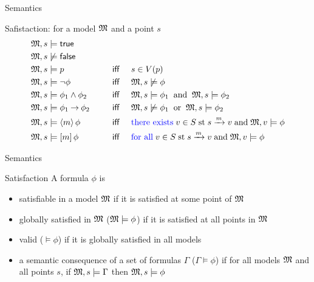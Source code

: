 \documentclass[aspectratio=169]{beamer}
\begin{document}
\begin{slide}{Semantics}\label{s:13}
\small
\begin{block}{Safistaction: for a model $\mathfrak{M}$ and a point $s$}
\begin{align*}
\mathfrak{M}, s & \models \mathsf{true} &&\\
\mathfrak{M}, s & \not \models  \mathsf{false} &&\\
\mathfrak{M}, s & \models  p &  \text{~~~ \textsf{iff} ~~~}  & s \in V(p)\\
\mathfrak{M}, s  & \models \neg \phi  & \text{~~~ \textsf{iff} ~~~} & \mathfrak{M}, s  \not \models \phi \\
\mathfrak{M}, s & \models \phi_1 \mathbin{\wedge} \phi_2  &\text{~~~ \textsf{iff} ~~~} & \mathfrak{M}, s \models  \phi_1 \;\; \text{and}\;\;
                                                   \mathfrak{M}, s \models  \phi_2 \\
\mathfrak{M}, s & \models \phi_1 \mathbin{\rightarrow} \phi_2 & \text{~~~ \textsf{iff} ~~~} & \mathfrak{M}, s \not \models \phi_1  \;\; \text{or}\;\; 
                                                  \mathfrak{M}, s \models \phi_2 \\
\mathfrak{M}, s  &\models \langle m \rangle\, \phi & \text{ ~~~ \textsf{iff} ~~~} &
\text{\textcolor{blue}{there exists}}\; v \in S \;\text{st}\; s \xrightarrow{m} v\; \text{and}\; \mathfrak{M}, v \models \phi\\
\mathfrak{M}, s & \models [m]\, \phi & \text{~~~ \textsf{iff} ~~~} &
\text{\textcolor{blue}{for all}}\; v \in S \; \text{st}\; s \xrightarrow{m} v\; \text{and}\; \mathfrak{M}, v \models \phi\\
\end{align*}
\end{block}
\end{slide}


\begin{slide}{Semantics}\label{s:14}
\small
\begin{block}{Satisfaction}
A formula $\phi$ is
\begin{itemize}
\item \alert{satisfiable in a model}  $\mathfrak{M}$ if it is satisfied at some point of $\mathfrak{M}$
\item \alert{globally satisfied} in $\mathfrak{M}$ ($\mathfrak{M} \models \phi$) if it is satisfied at all points in $\mathfrak{M}$
\item \alert{valid} ($\models \phi$) if it is globally satisfied in all models
\item \alert{a semantic consequence} of a set of formulas $\Gamma$ ($\Gamma \models \phi$) if for all models $\mathfrak{M}$ and all
points $s$, if $\mathfrak{M}, s \models \Gamma$ then $\mathfrak{M}, s \models \phi$
\end{itemize}
\end{block}
\end{slide}
\end{document}
